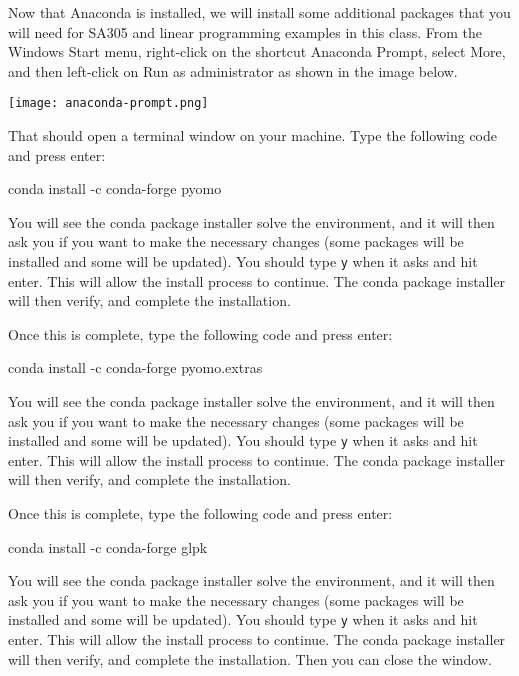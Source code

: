 \documentclass[12pt]{article}
\begin{document}
Now that Anaconda is installed, we will install some additional packages that you will need for SA305 and linear programming examples in this class. From the Windows Start menu, right-click on the shortcut Anaconda Prompt, select More, and then left-click on Run as administrator as shown in the image below.

\begin{center}
\texttt{[image: anaconda-prompt.png]}
\end{center} 

That should open a terminal window on your machine. Type the following code and press enter: \begin{center}
conda install -c conda-forge pyomo
\end{center}
You will see the conda package installer solve the environment, and it will then ask you if you want to make the necessary changes (some packages will be installed and some will be updated).  You should type {\tt y} when it asks and hit enter.  This will allow the install process to continue.  The conda package installer will then verify, and complete the installation. 

Once this is complete, type the following code and press enter: \begin{center}
conda install -c conda-forge pyomo.extras
\end{center}
You will see the conda package installer solve the environment, and it will then ask you if you want to make the necessary changes (some packages will be installed and some will be updated).  You should type {\tt y} when it asks and hit enter.  This will allow the install process to continue.  The conda package installer will then verify, and complete the installation. 
%
%
%

Once this is complete, type the following code and press enter: \begin{center}
conda install -c conda-forge glpk 
\end{center}
You will see the conda package installer solve the environment, and it will then ask you if you want to make the necessary changes (some packages will be installed and some will be updated).  You should type {\tt y} when it asks and hit enter.  This will allow the install process to continue.  The conda package installer will then verify, and complete the installation. Then you can close the window.
\end{document}
